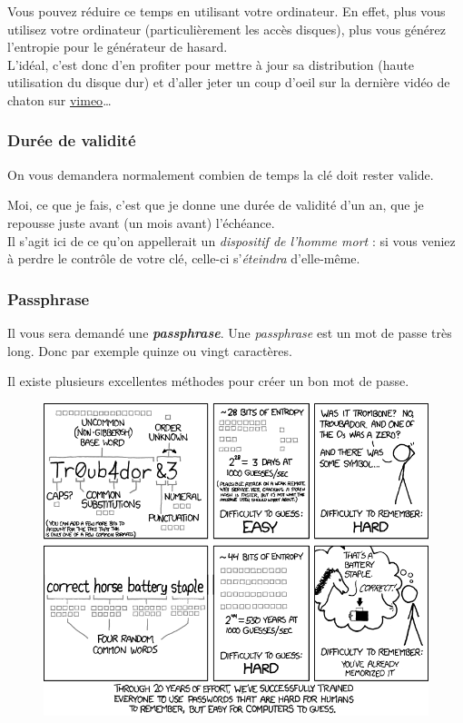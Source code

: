 Vous pouvez réduire ce temps en utilisant votre ordinateur. En effet,
plus vous utilisez votre ordinateur (particulièrement les accès
disques), plus vous générez l'entropie pour le générateur de
hasard.\\L'idéal, c'est donc d'en profiter pour mettre à jour sa
distribution (haute utilisation du disque dur) et d'aller jeter un coup
d'oeil sur la dernière vidéo de chaton sur
\href{https://vimeo.com/tag:cat}{vimeo}\ldots{}

\subsubsection{Durée de validité}\label{duruxe9e-de-validituxe9}

On vous demandera normalement combien de temps la clé doit rester
valide.

Moi, ce que je fais, c'est que je donne une durée de validité d'un an,
que je repousse juste avant (un mois avant) l'échéance.\\Il s'agit ici
de ce qu'on appellerait un \emph{dispositif de l'homme mort} : si vous
veniez à perdre le contrôle de votre clé, celle-ci s'\emph{éteindra}
d'elle-même.

\subsubsection{Passphrase}\label{passphrase}

Il vous sera demandé une \textbf{\emph{passphrase}}. Une
\emph{passphrase} est un mot de passe très long. Donc par exemple quinze
ou vingt caractères.

Il existe plusieurs excellentes méthodes pour créer un bon mot de passe.

\begin{figure}
\includegraphics[width=\linewidth]{./images/password_strength.png}
\caption[Recommandations pour un mot de passe fort, par XKCD (https://xkcd.com/936/)]{}
\caption{}
\label{fig:password_strength}
\end{figure}

